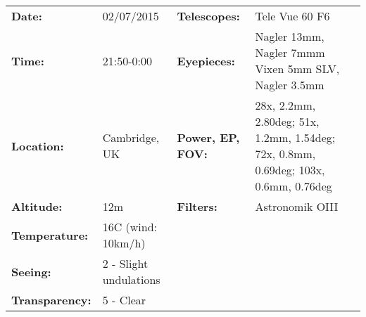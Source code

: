 \begin{tabular}{ p{0.9in} p{1.3in} p{1.2in} p{5.2in}}
{\bf Date:} & 02/07/2015 & {\bf Telescopes:} & Tele Vue 60 F6 \\ 
{\bf Time:} & 21:50-0:00 & {\bf Eyepieces:} & Nagler 13mm, Nagler 7mmm Vixen 5mm SLV, Nagler 3.5mm \\ 
{\bf Location:} & Cambridge, UK & {\bf Power, EP, FOV:} & 28x, 2.2mm, 2.80deg; 51x, 1.2mm, 1.54deg; 72x, 0.8mm, 0.69deg; 103x, 0.6mm, 0.76deg \\ 
{\bf Altitude:} & 12m & {\bf Filters:} & Astronomik OIII \\ 
{\bf Temperature:} & 16C (wind: 10km/h) & & \\ 
{\bf Seeing:} & 2 - Slight undulations & & \\ 
{\bf Transparency:} & 5 - Clear & & \\ 
\end{tabular}
\centering 

